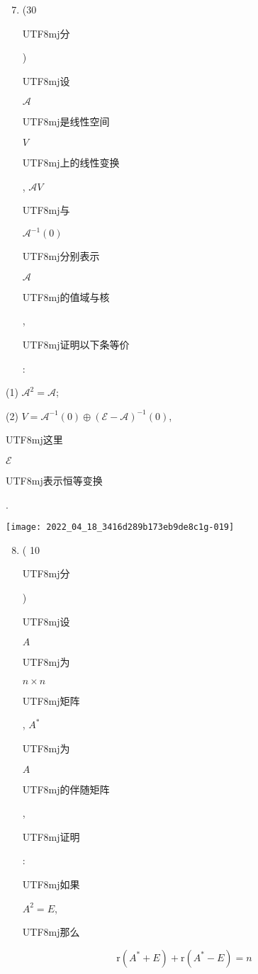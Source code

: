\documentclass[10pt]{article}
\begin{document}
\begin{enumerate}
  \setcounter{enumi}{6}
  \item (30 \begin{CJK}{UTF8}{mj}分\end{CJK}) \begin{CJK}{UTF8}{mj}设\end{CJK} $\mathscr{A}$ \begin{CJK}{UTF8}{mj}是线性空间\end{CJK} $V$ \begin{CJK}{UTF8}{mj}上的线性变换\end{CJK}, $\mathscr{A} V$ \begin{CJK}{UTF8}{mj}与\end{CJK} $\mathscr{A}^{-1}(0)$ \begin{CJK}{UTF8}{mj}分别表示\end{CJK} $\mathscr{A}$ \begin{CJK}{UTF8}{mj}的值域与核\end{CJK}, \begin{CJK}{UTF8}{mj}证明以下条等价\end{CJK}:
\end{enumerate}
(1) $\mathscr{A}^{2}=\mathscr{A}$;

(2) $V=\mathscr{A}^{-1}(0) \oplus(\mathscr{E}-\mathscr{A})^{-1}(0)$, \begin{CJK}{UTF8}{mj}这里\end{CJK} $\mathscr{E}$ \begin{CJK}{UTF8}{mj}表示恒等变换\end{CJK}.

\texttt{[image: 2022\_04\_18\_3416d289b173eb9de8c1g-019]}

\begin{enumerate}
  \setcounter{enumi}{7}
  \item ( 10 \begin{CJK}{UTF8}{mj}分\end{CJK}) \begin{CJK}{UTF8}{mj}设\end{CJK} $A$ \begin{CJK}{UTF8}{mj}为\end{CJK} $n \times n$ \begin{CJK}{UTF8}{mj}矩阵\end{CJK}, $A^{*}$ \begin{CJK}{UTF8}{mj}为\end{CJK} $A$ \begin{CJK}{UTF8}{mj}的伴随矩阵\end{CJK}, \begin{CJK}{UTF8}{mj}证明\end{CJK}: \begin{CJK}{UTF8}{mj}如果\end{CJK} $A^{2}=E$, \begin{CJK}{UTF8}{mj}那么\end{CJK}
\end{enumerate}
$$
\mathrm{r}\left(A^{*}+E\right)+\mathrm{r}\left(A^{*}-E\right)=n
$$
\end{document}
